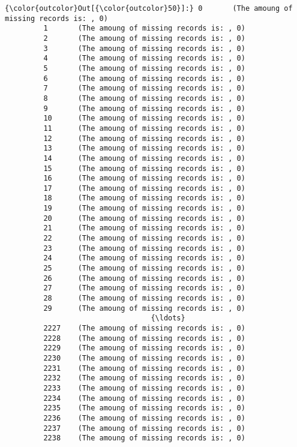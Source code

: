 \documentclass[11pt]{article}
\begin{document}
\begin{Verbatim}[commandchars=\\\{\}]
{\color{outcolor}Out[{\color{outcolor}50}]:} 0       (The amoung of missing records is: , 0)
         1       (The amoung of missing records is: , 0)
         2       (The amoung of missing records is: , 0)
         3       (The amoung of missing records is: , 0)
         4       (The amoung of missing records is: , 0)
         5       (The amoung of missing records is: , 0)
         6       (The amoung of missing records is: , 0)
         7       (The amoung of missing records is: , 0)
         8       (The amoung of missing records is: , 0)
         9       (The amoung of missing records is: , 0)
         10      (The amoung of missing records is: , 0)
         11      (The amoung of missing records is: , 0)
         12      (The amoung of missing records is: , 0)
         13      (The amoung of missing records is: , 0)
         14      (The amoung of missing records is: , 0)
         15      (The amoung of missing records is: , 0)
         16      (The amoung of missing records is: , 0)
         17      (The amoung of missing records is: , 0)
         18      (The amoung of missing records is: , 0)
         19      (The amoung of missing records is: , 0)
         20      (The amoung of missing records is: , 0)
         21      (The amoung of missing records is: , 0)
         22      (The amoung of missing records is: , 0)
         23      (The amoung of missing records is: , 0)
         24      (The amoung of missing records is: , 0)
         25      (The amoung of missing records is: , 0)
         26      (The amoung of missing records is: , 0)
         27      (The amoung of missing records is: , 0)
         28      (The amoung of missing records is: , 0)
         29      (The amoung of missing records is: , 0)
                                  {\ldots}                   
         2227    (The amoung of missing records is: , 0)
         2228    (The amoung of missing records is: , 0)
         2229    (The amoung of missing records is: , 0)
         2230    (The amoung of missing records is: , 0)
         2231    (The amoung of missing records is: , 0)
         2232    (The amoung of missing records is: , 0)
         2233    (The amoung of missing records is: , 0)
         2234    (The amoung of missing records is: , 0)
         2235    (The amoung of missing records is: , 0)
         2236    (The amoung of missing records is: , 0)
         2237    (The amoung of missing records is: , 0)
         2238    (The amoung of missing records is: , 0)

\end{Verbatim}
\end{document}
